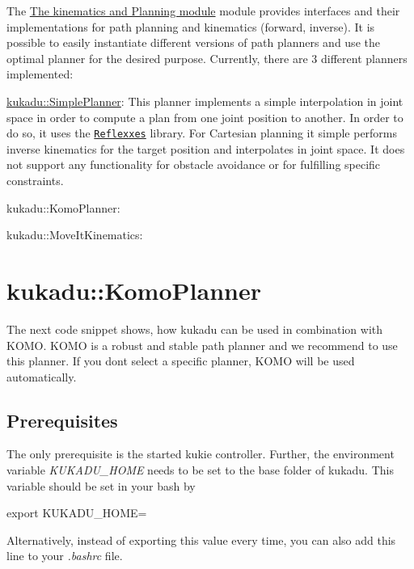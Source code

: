 The \hyperlink{index_kinematics}{The kinematics and Planning module} module provides interfaces and their implementations for path planning and kinematics (forward, inverse). It is possible to easily instantiate different versions of path planners and use the optimal planner for the desired purpose. Currently, there are 3 different planners implemented\+:
\begin{DoxyItemize}
\item \hyperlink{classkukadu_1_1SimplePlanner}{kukadu\+::\+Simple\+Planner}\+: This planner implements a simple interpolation in joint space in order to compute a plan from one joint position to another. In order to do so, it uses the \href{http://www.reflexxes.ws/}{\tt Reflexxes} library. For Cartesian planning it simple performs inverse kinematics for the target position and interpolates in joint space. It does not support any functionality for obstacle avoidance or for fulfilling specific constraints.
\item kukadu\+::\+Komo\+Planner\+:
\item kukadu\+::\+Move\+It\+Kinematics\+:
\end{DoxyItemize}

\section*{kukadu\+::\+Komo\+Planner}

The next code snippet shows, how kukadu can be used in combination with K\+O\+MO. K\+O\+MO is a robust and stable path planner and we recommend to use this planner. If you don\textquotesingle{}t select a specific planner, K\+O\+MO will be used automatically.


\begin{DoxyCodeInclude}
\end{DoxyCodeInclude}


\subsection*{Prerequisites}

The only prerequisite is the started kukie controller. Further, the environment variable {\itshape K\+U\+K\+A\+D\+U\+\_\+\+H\+O\+ME} needs to be set to the base folder of kukadu. This variable should be set in your bash by 
\begin{DoxyCode}
export KUKADU\_HOME=%
\end{DoxyCode}
 Alternatively, instead of exporting this value every time, you can also add this line to your {\itshape .bashrc} file.

